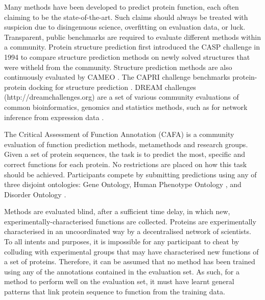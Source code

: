Many methods have been developed to predict protein function, each often claiming to be the state-of-the-art. Such claims should always be treated with suspicion due to disingenuous science, overfitting on evaluation data, or luck. Transparent, public benchmarks are required to evaluate different methods within a community. Protein structure prediction first introduced the CASP \cite{Kryshtafovych2019} challenge in 1994 to compare structure prediction methods on newly solved structures that were witheld from the community. Structure prediction methods are also continuously evaluated by CAMEO \cite{Haas2018}. The CAPRI challenge benchmarks protein-protein docking for structure prediction \cite{Janin2002,Janin2005}. DREAM challenges (http://dreamchallenges.org) are a set of various community evaluations of common bioinformatics, genomics and statistics methods, such as for network inference from expression data \cite{Marbach2012}.

The Critical Assessment of Function Annotation (CAFA) \cite{Radivojac2013,Jiang2016,Zhou2019} is a community evaluation of function prediction methods, metamethods and research groups. Given a set of protein sequences, the task is to predict the most, specific and correct functions for each protein. No restrictions are placed on how this task should be achieved. Participants compete by submitting predictions using any of three disjoint ontologies: Gene Ontology, Human Phenotype Ontology \cite{Kohler2019}, and Disorder Ontology \cite{Hatos2020}.

Methods are evaluated blind, after a sufficient time delay, in which new, experimentally-characterised functions are collected. Proteins are experimentally characterised in an uncoordinated way by a decentralised network of scientists. To all intents and purposes, it is impossible for any participant to cheat by colluding with experimental groups that may have characterised new functions of a set of proteins. Therefore, it can be assumed that no method has been trained using any of the annotations contained in the evaluation set. As such, for a method to perform well on the evaluation set, it must have learnt general patterns that link protein sequence to function from the training data.


